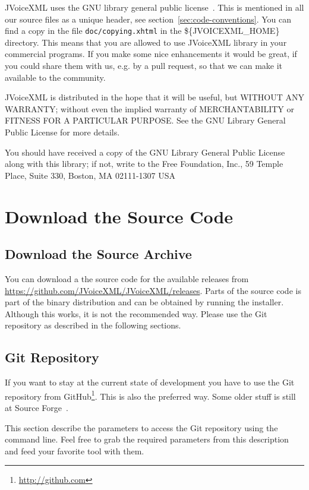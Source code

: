 \documentclass[11pt,a4paper]{article}
\begin{document}
JVoiceXML uses the GNU library general public license~\cite{gnu:lgpg}. 
This is mentioned in all our source files as a unique header, see
section~\ref{sec:code-conventions}.
You can find a copy in the file \texttt{doc/copying.xhtml} in the \$\{JVOICEXML\_HOME\}
directory. This means that you are allowed to use JVoiceXML
library in your commercial programs. If you make some nice
enhancements it would be great, if you could share them
with us, e.g. by a pull request, so that we can make it available to the community.

JVoiceXML is distributed in the hope that it will be useful,
but WITHOUT ANY WARRANTY; without even the implied warranty of
MERCHANTABILITY or FITNESS FOR A PARTICULAR PURPOSE. See the GNU
Library General Public License for more details.

You should have received a copy of the GNU Library General Public
License along with this library; if not, write to the Free
Foundation, Inc., 59 Temple Place, Suite 330, Boston, MA  02111-1307  USA

\section{Download the Source Code}

\subsection{Download the Source Archive}

You can download a the source code for the available releases from 
\url{https://github.com/JVoiceXML/JVoiceXML/releases}. Parts of the source code
is part of the binary distribution and can be obtained by running the installer.
Although this works, it is not the recommended way. Please use the Git
repository as described in the following sections. 

\subsection{Git Repository}
\label{sec:git-repository}

If you want to stay at the current state of development you have to use
the Git repository from GitHub\footnote{\url{http://github.com}}. This is also
the preferred way. Some older stuff is still at Source Forge~\cite{sourceforge}.

This section describe the parameters to access the Git repository 
using the command line. Feel free to grab the required parameters from
this description and feed your favorite tool with them.
\end{document}
